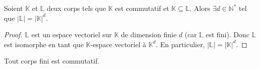 






  \begin{lemma}
    \label{theoreme-de-wedderburn-1}
    Soient $\mathbb{K}$ et $\mathbb{L}$ deux corps tels que $\mathbb{K}$ est commutatif et $\mathbb{K} \subseteq \mathbb{L}$. Alors $\exists d \in \mathbb{N}^*$ tel que $|\mathbb{L}| = |\mathbb{K}|^d$.
  \end{lemma}

  \begin{proof}
    $\mathbb{L}$ est un espace vectoriel sur $\mathbb{K}$ de dimension finie $d$ (car $\mathbb{L}$ est fini). Donc $\mathbb{L}$ est isomorphe en tant que $\mathbb{K}$-espace vectoriel à $\mathbb{K}^d$. En particulier, $|\mathbb{L}| = |\mathbb{K}|^d$.
  \end{proof}

  \begin{theorem}[Wedderburn]
    Tout corps fini est commutatif.
  \end{theorem}

